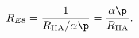 \begin{equation}
R_{E8}=\frac{1}{R_{\textup{IIA}}/\alpha\p}=\frac{\alpha\p}{R_{\textup{IIA}}}.
\end{equation}

